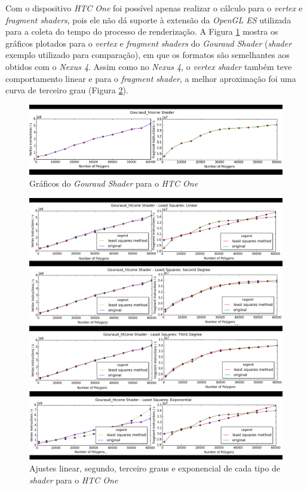 	Com o dispositivo \textit{HTC One} foi possível apenas realizar o cálculo para o \textit{vertex} e \textit{fragment shaders}, pois ele não dá suporte à extensão da \textit{OpenGL ES} utilizada para a coleta do tempo do processo de renderização. A Figura \ref{htc1} mostra os gráficos plotados para o \textit{vertex} e \textit{fragment shaders} do \textit{Gouraud Shader} (\textit{shader} exemplo utilizado para comparação), em que os formatos são semelhantes aos obtidos com o \textit{Nexus 4}. Assim como no \textit{Nexus 4}, o \textit{vertex shader} também teve comportamento linear e para o \textit{fragment shader}, a melhor aproximação foi uma curva de terceiro grau (Figura \ref{htc1_ajuste}). 

	\begin{figure}[ht]
	\centering
		\includegraphics[keepaspectratio=true,scale=0.55]{figuras/htc_render.png}
	\caption{Gráficos do \textit{Gouraud Shader} para o \textit{HTC One}}
	\label{htc1}
	\end{figure}

	\begin{figure}[ht]
	\centering
		\includegraphics[keepaspectratio=true,scale=0.4]{figuras/htc_minquad_render.png}
	\caption{Ajustes linear, segundo, terceiro graus e exponencial de cada tipo de \textit{shader} para o \textit{HTC One}}
	\label{htc1_ajuste}
	\end{figure}	
	

